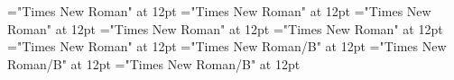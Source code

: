 \documentclass[c5paper,twoside]{article}
\begin{document}
 
\pagestyle{plain} 
\font\picturepictureRight="Times New Roman" at 12pt
\font\imgpicturedivpictureLeft="Times New Roman" at 12pt
\font\scrBookscrBody="Times New Roman" at 12pt
\font\columnsscrBookscrBody="Times New Roman" at 12pt
\font\scrSectioncolumnsscrBookscrBody="Times New Roman" at 12pt
\font\ParagraphscrSectioncolumnsscrBookscrBody="Times New Roman" at 12pt
\font\ChapterNumberzxxParagraphscrSectioncolumnsscrBookscrBody="Times New Roman/B" at 12pt
\font\SectionHeadscrSectioncolumnsscrBookscrBody="Times New Roman/B" at 12pt
\font\spanzxxSectionHeadscrSectioncolumnsscrBookscrBody="Times New Roman/B" at 12pt

\pagestyle{fancy} 
\setlength{\columnsep}{12pt} 
\setlength\columnseprule{0.4pt} 
\begin{multicols}{2}{\raggedright} 
\leftmargin 0pt{\ChapterNumberzxxParagraphscrSectioncolumnsscrBookscrBody{\lettrine{2}}
 {\raggedright} \begin{adjustwidth}{0pt}{0pt}{0pt}{0pt}\begin{center}
\spanzxxSectionHeadscrSectioncolumnsscrBookscrBody{Betlehemfɔ Abí Mɔ }\end{center}\end{adjustwidth} 
 \end{multicols}
\end{document}
